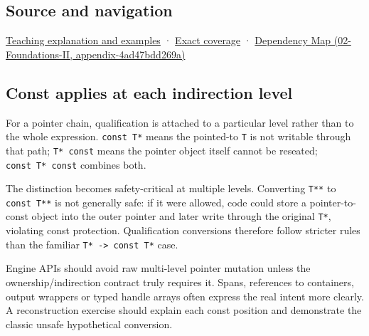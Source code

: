 \subsection{Source and navigation}\label{appendix-5e1a7561cd98-source-and-navigation}

\hyperref[01-foundations-i-ch003-read-only-is-a-path-not-an-ownership-or-synchronization-promise]{Teaching explanation and examples} · \hyperref[appendix-fd090d982a15-m008---parts-113-126]{Exact coverage} · \href{../02-Foundations-II/main.pdf\#nameddest=appendix-4ad47bdd269a}{Dependency Map (02-Foundations-II, appendix-4ad47bdd269a)}

\subsection{Const applies at each indirection level}\label{appendix-5e1a7561cd98-const-applies-at-each-indirection-level}

For a pointer chain, qualification is attached to a particular level rather than to the whole expression. \texttt{const\ T*} means the pointed-to \texttt{T} is not writable through that path; \texttt{T*\ const} means the pointer object itself cannot be reseated; \texttt{const\ T*\ const} combines both.

The distinction becomes safety-critical at multiple levels. Converting \texttt{T**} to \texttt{const\ T**} is not generally safe: if it were allowed, code could store a pointer-to-const object into the outer pointer and later write through the original \texttt{T*}, violating const protection. Qualification conversions therefore follow stricter rules than the familiar \texttt{T*\ -\textgreater{}\ const\ T*} case.

Engine APIs should avoid raw multi-level pointer mutation unless the ownership/indirection contract truly requires it. Spans, references to containers, output wrappers or typed handle arrays often express the real intent more clearly. A reconstruction exercise should explain each const position and demonstrate the classic unsafe hypothetical conversion.

